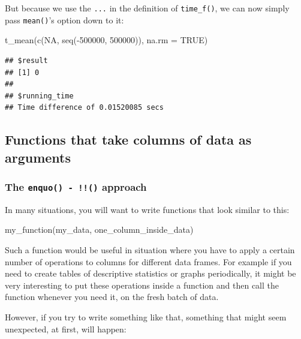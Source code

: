 \documentclass[
]{article}
\newenvironment{Shaded}{\begin{snugshade}}{\end{snugshade}}
\newcommand{\AttributeTok}[1]{\textcolor[rgb]{0.77,0.63,0.00}{#1}}
\newcommand{\ConstantTok}[1]{\textcolor[rgb]{0.00,0.00,0.00}{#1}}
\newcommand{\DecValTok}[1]{\textcolor[rgb]{0.00,0.00,0.81}{#1}}
\newcommand{\FunctionTok}[1]{\textcolor[rgb]{0.00,0.00,0.00}{#1}}
\newcommand{\NormalTok}[1]{#1}
\newcommand{\SpecialCharTok}[1]{\textcolor[rgb]{0.00,0.00,0.00}{#1}}
\begin{document}
But because we use the \texttt{...} in the definition of \texttt{time\_f()}, we can now simply pass \texttt{mean()}'s option down to it:

\begin{Shaded}
\begin{Highlighting}[]
\FunctionTok{t\_mean}\NormalTok{(}\FunctionTok{c}\NormalTok{(}\ConstantTok{NA}\NormalTok{, }\FunctionTok{seq}\NormalTok{(}\SpecialCharTok{{-}}\DecValTok{500000}\NormalTok{, }\DecValTok{500000}\NormalTok{)), }\AttributeTok{na.rm =} \ConstantTok{TRUE}\NormalTok{)}
\end{Highlighting}
\end{Shaded}

\begin{verbatim}
## $result
## [1] 0
## 
## $running_time
## Time difference of 0.01520085 secs
\end{verbatim}

\hypertarget{functions-that-take-columns-of-data-as-arguments}{%
\subsection{Functions that take columns of data as arguments}\label{functions-that-take-columns-of-data-as-arguments}}

\hypertarget{the-enquo---approach}{%
\subsubsection{\texorpdfstring{The \texttt{enquo()\ -\ !!()} approach}{The enquo() - !!() approach}}\label{the-enquo---approach}}

In many situations, you will want to write functions that look similar to this:

\begin{Shaded}
\begin{Highlighting}[]
\FunctionTok{my\_function}\NormalTok{(my\_data, one\_column\_inside\_data)}
\end{Highlighting}
\end{Shaded}

Such a function would be useful in situation where you have to apply a certain number of operations
to columns for different data frames. For example if you need to create tables of descriptive
statistics or graphs periodically, it might be very interesting to put these operations inside a
function and then call the function whenever you need it, on the fresh batch of data.

However, if you try to write something like that, something that might seem unexpected, at first,
will happen:
\end{document}

